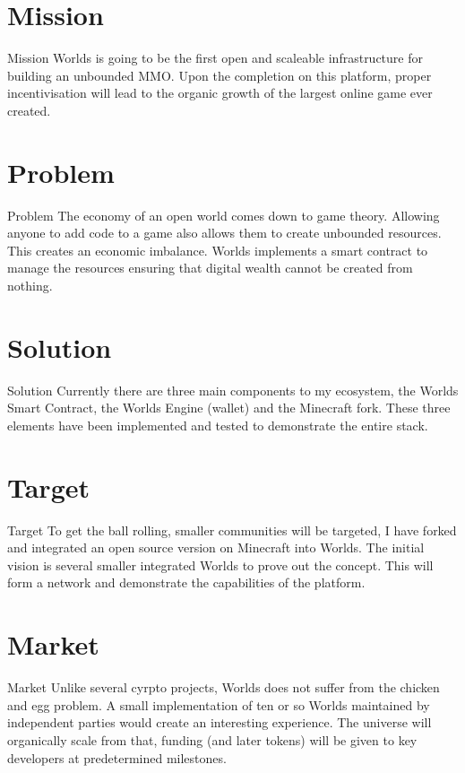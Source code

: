 \documentclass[final, xcolor=pdftex, dvipsnames, table, aspectratio=169, 14pt]{beamer}
\begin{document}
\section{Mission}
\begin{frame}{Mission}
Worlds is going to be the first open and scaleable infrastructure for building an unbounded MMO. Upon the completion on this platform, proper incentivisation will lead to the organic growth of the largest online game ever created.
\end{frame}

\section{Problem}
\begin{frame}{Problem}
The economy of an open world comes down to game theory. Allowing anyone to add code to a game also allows them to create unbounded resources. This creates an economic imbalance. Worlds implements a smart contract to manage the resources ensuring that digital wealth cannot be created from nothing.  
\end{frame}

\section{Solution}
\begin{frame}{Solution}
Currently there are three main components to my ecosystem, the Worlds Smart Contract, the Worlds Engine (wallet) and the Minecraft fork. These three elements have been implemented and tested to demonstrate the entire stack. 
\end{frame}

\section{Target}
\begin{frame}{Target}
To get the ball rolling, smaller communities will be targeted, I have forked and integrated an open source version on Minecraft into Worlds. The initial vision is several smaller integrated Worlds to prove out the concept. This will form a network and demonstrate the capabilities of the platform.
\end{frame}

\section{Market}
\begin{frame}{Market}
Unlike several cyrpto projects, Worlds does not suffer from the chicken and egg problem. A small implementation of ten or so Worlds maintained by independent parties would create an interesting experience. The universe will organically scale from that, funding (and later tokens) will be given to key developers at predetermined milestones.
\end{frame}
\end{document}
